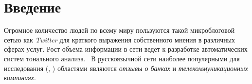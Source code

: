 \section{Введение}
%
%
Огромное количество людей по всему миру пользуются такой микроблоговой сетью
как {\it Twitter} для краткого выражения собственного мнения в различных сферах
услуг.
Рост объема информации в сети ведет к разработке автоматических систем
тонального анализа.~\cite{tonalityAnalysis}
В русскоязычной сети наиболее популярными для исследования (\cite{dialog2015},
\cite{dialog2016}) областями являются {\it отзывы о банках} и
{\it телекоммуникационных компаниях}.
